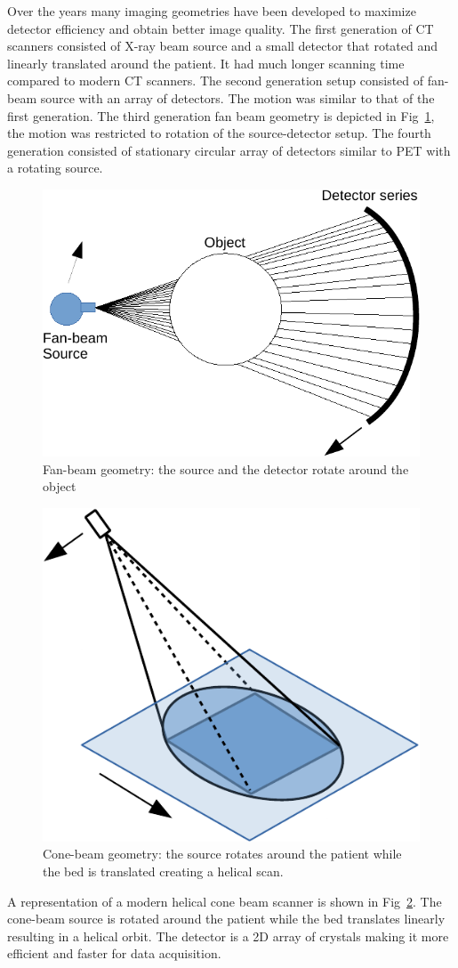 Over the years many imaging geometries have been developed to maximize detector efficiency and obtain better image quality. The first generation of \ac{CT} scanners consisted of X-ray beam source and a small detector that rotated and linearly translated around the patient. It had much longer scanning time compared to modern \ac{CT} scanners. The second generation setup consisted of fan-beam source with an array of detectors. The motion was similar to that of the first generation. The third generation fan beam geometry is depicted in Fig~\ref{fig:xgeo}, the motion was restricted to rotation of the source-detector setup. The fourth generation consisted of stationary circular array of detectors similar to \ac{PET} with a rotating source. 
\begin{figure}[!htbp]
	\centering
	\includegraphics[width=0.6\linewidth]{./Figures/x_ray_geo-crop.pdf}
	\caption{Fan-beam geometry: the source and the detector rotate around the object}
	\label{fig:xgeo}
\end{figure}

\begin{figure}[!htbp]
	\centering
	\includegraphics[width=0.6\linewidth]{./Figures/cbct-crop.pdf}
	\caption{Cone-beam geometry: the source rotates around the patient while the bed is translated creating a helical scan.}
	\label{fig:cbct}
\end{figure}
A representation of a modern helical cone beam scanner is shown in Fig~\ref{fig:cbct}. The cone-beam source is rotated around the patient while the bed translates linearly resulting in a helical orbit. The detector is a 2D array of crystals making it more efficient and faster for data acquisition.

